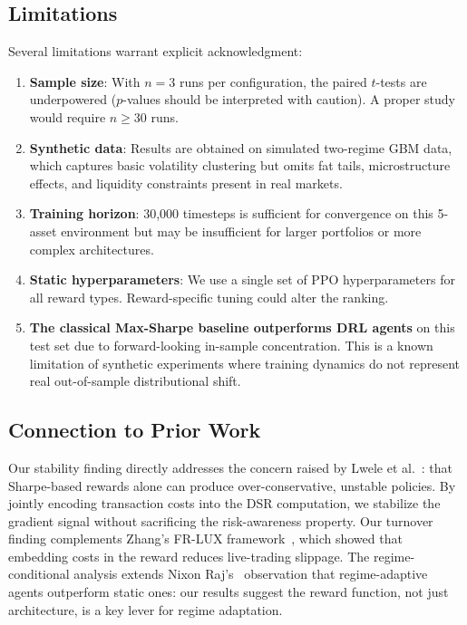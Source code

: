 \documentclass[conference]{IEEEtran}
\begin{document}
\subsection{Limitations}
Several limitations warrant explicit acknowledgment:
\begin{enumerate}
    \item \textbf{Sample size}: With $n=3$ runs per configuration, the paired
    $t$-tests are underpowered ($p$-values should be interpreted with caution).
    A proper study would require $n \geq 30$ runs.
    \item \textbf{Synthetic data}: Results are obtained on simulated two-regime
    GBM data, which captures basic volatility clustering but omits fat tails,
    microstructure effects, and liquidity constraints present in real markets.
    \item \textbf{Training horizon}: 30,000 timesteps is sufficient for convergence
    on this 5-asset environment but may be insufficient for larger portfolios or
    more complex architectures.
    \item \textbf{Static hyperparameters}: We use a single set of PPO
    hyperparameters for all reward types. Reward-specific tuning could alter the
    ranking.
    \item \textbf{The classical Max-Sharpe baseline outperforms DRL agents}
    on this test set due to forward-looking in-sample concentration. This is a
    known limitation of synthetic experiments where training dynamics do not
    represent real out-of-sample distributional shift.
\end{enumerate}

\subsection{Connection to Prior Work}
Our stability finding directly addresses the concern raised by Lwele et
al.~\cite{Lwele2025RiskAware}: that Sharpe-based rewards alone can produce
over-conservative, unstable policies. By jointly encoding transaction costs into
the DSR computation, we stabilize the gradient signal without sacrificing the
risk-awareness property. Our turnover finding complements Zhang's FR-LUX
framework~\cite{Zhang2025FRLUX}, which showed that embedding costs in the reward
reduces live-trading slippage. The regime-conditional analysis extends Nixon
Raj's~\cite{Nixon2025Regime} observation that regime-adaptive agents outperform
static ones: our results suggest the reward function, not just architecture, is a
key lever for regime adaptation.
\end{document}
